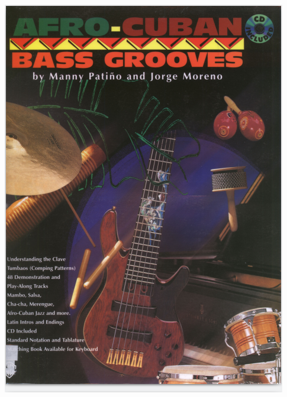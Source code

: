 \documentclass[a4paper]{book}
\begin{document}
\begin{center}
\includegraphics[width=12.407cm,height=17.353cm]{lebluessupportsmethodes-img165.png}
\end{center}
\end{document}
